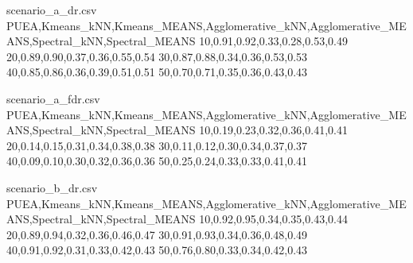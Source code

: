 \begin{figure}[h]
\centering
{}
\end{figure}


\begin{filecontents*}{scenario_a_dr.csv}
PUEA,Kmeans_kNN,Kmeans_MEANS,Agglomerative_kNN,Agglomerative_MEANS,Spectral_kNN,Spectral_MEANS
10,0.91,0.92,0.33,0.28,0.53,0.49
20,0.89,0.90,0.37,0.36,0.55,0.54
30,0.87,0.88,0.34,0.36,0.53,0.53
40,0.85,0.86,0.36,0.39,0.51,0.51
50,0.70,0.71,0.35,0.36,0.43,0.43
\end{filecontents*}

\begin{filecontents*}{scenario_a_fdr.csv}
PUEA,Kmeans_kNN,Kmeans_MEANS,Agglomerative_kNN,Agglomerative_MEANS,Spectral_kNN,Spectral_MEANS
10,0.19,0.23,0.32,0.36,0.41,0.41
20,0.14,0.15,0.31,0.34,0.38,0.38
30,0.11,0.12,0.30,0.34,0.37,0.37
40,0.09,0.10,0.30,0.32,0.36,0.36
50,0.25,0.24,0.33,0.33,0.41,0.41
\end{filecontents*}

\begin{filecontents*}{scenario_b_dr.csv}
PUEA,Kmeans_kNN,Kmeans_MEANS,Agglomerative_kNN,Agglomerative_MEANS,Spectral_kNN,Spectral_MEANS
10,0.92,0.95,0.34,0.35,0.43,0.44
20,0.89,0.94,0.32,0.36,0.46,0.47
30,0.91,0.93,0.34,0.36,0.48,0.49
40,0.91,0.92,0.31,0.33,0.42,0.43
50,0.76,0.80,0.33,0.34,0.42,0.43
\end{filecontents*}

